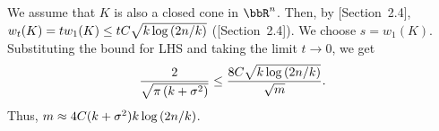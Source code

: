 We assume that $K$ is also a closed cone in $\bbR^n$. Then, by [Section~2.4]\cite{vershyninPlan}, $w_t(K) = tw_1(K) \leq t C\sqrt{k\log\left(2n/k\right)}$ ([Section~2.4]\cite{vershyninPlan}). We choose $s = w_1(K)$. Substituting the bound for LHS and taking the limit $t\rightarrow 0$, we get
\begin{align*}
\frac{2}{\sqrt{\pi\left(k+\sigma^2\right)}}\leq \frac{8 C \sqrt{k\log\left(2n/k\right)}}{\sqrt{m}}.
\end{align*} Thus, $m\approx 4C(k+ \sigma^2)k\log\left(2n/k\right)$. 

